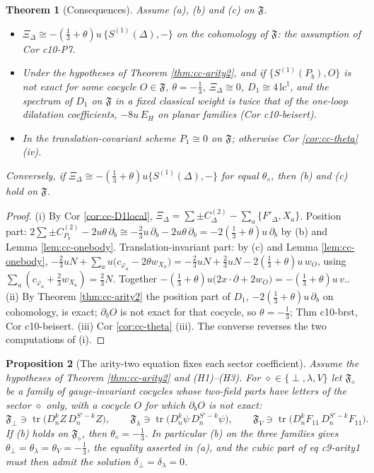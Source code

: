 \documentclass[11pt]{article}
\numberwithin{equation}{section}
\theoremstyle{plain}
\newtheorem{theorem}{Theorem}[section]
\newtheorem{proposition}[theorem]{Proposition}
\theoremstyle{definition}
\begin{document}
\begin{theorem}[Consequences]
\label{thm:cc-P7}
Assume (a), (b) and (c) on $\mathfrak F$.
\begin{itemize}
\item[(i)] $\Xi_\Delta\cong-(\tfrac13+\theta)u\,\{S^{(1)}(\Delta),-\}$ on the cohomology of $\mathfrak F$: the assumption of Cor c10-P7.
\item[(ii)] Under the hypotheses of Theorem \ref{thm:cc-arity2}, and if $\{S^{(1)}(P_b),O\}$ is not exact for some cocycle $O\in\mathfrak F$, $\theta=-\tfrac13$, $\Xi_\Delta\cong0$, $D_1\cong4\,\mathrm{lc}^\natural$, and the spectrum of $D_1$ on $\mathfrak F$ in a fixed classical weight is twice that of the one-loop dilatation coefficients, $-8u\,E_H$ on planar families (Cor c10-beisert).
\item[(iii)] In the translation-covariant scheme $P_1\cong0$ on $\mathfrak F$; otherwise Cor \ref{cor:cc-theta} (iv).
\end{itemize}
Conversely, if $\Xi_\Delta\cong-(\tfrac13+\theta)u\{S^{(1)}(\Delta),-\}$ for equal $\theta_\diamond$, then (b) and (c) hold on $\mathfrak F$.
\end{theorem}


\begin{proof}
(i) By Cor \ref{cor:cc-D1local}, $\Xi_\Delta=\sum\pm C^{(2)}_\Delta-\sum_a\{F'_\Delta,X_a\}$. Position part: $2\sum\pm C^{(2)}_{P_b}-2u\theta\,\partial_b\cong-\tfrac23u\,\partial_b-2u\theta\,\partial_b=-2(\tfrac13+\theta)u\,\partial_b$ by (b) and Lemma \ref{lem:cc-onebody}. Translation-invariant part: by (c) and Lemma \ref{lem:cc-onebody}, $-\tfrac23uN+\sum_au\big(c_{\varphi_a}-2\theta w_{X_a}\big)=-\tfrac23uN+\tfrac23uN-2(\tfrac13+\theta)u\,w_O$, using $\sum_a(c_{\varphi_a}+\tfrac23w_{X_a})=\tfrac23N$. Together $-(\tfrac13+\theta)u\big(2x\cdot\partial+2w_O\big)=-(\tfrac13+\theta)u\,v.$. (ii) By Theorem \ref{thm:cc-arity2} the position part of $D_1$, $-2(\tfrac13+\theta)u\,\partial_b$ on cohomology, is exact; $\partial_bO$ is not exact for that cocycle, so $\theta=-\tfrac13$; Thm c10-brst, Cor c10-beisert. (iii) Cor \ref{cor:cc-theta} (iii). The converse reverses the two computations of (i).
\end{proof}

\begin{proposition}[The arity-two equation fixes each sector coefficient]
\label{prop:cc-theta-sector}
Assume the hypotheses of Theorem \ref{thm:cc-arity2} and (H1)--(H3). For $\diamond\in\{\perp,\lambda,V\}$ let $\mathfrak F_\diamond$ be a family of gauge-invariant cocycles whose two-field parts have letters of the sector $\diamond$ only, with a cocycle $O$ for which $\partial_bO$ is not exact:
\[
\mathfrak F_\perp\ni\operatorname{tr}\big(D_n^kZ\,D_n^{S'-k}Z\big),\qquad \mathfrak F_\lambda\ni\operatorname{tr}\big(D_n^k\psi\,D_n^{S'-k}\psi\big),\qquad \mathfrak F_V\ni\operatorname{tr}\big(D_n^kF_{11}\,D_n^{S'-k}F_{11}\big).
\]
If (b) holds on $\mathfrak F_\diamond$, then $\theta_\diamond=-\tfrac13$. In particular (b) on the three families gives $\theta_\perp=\theta_\lambda=\theta_V=-\tfrac13$, the equality asserted in (a), and the cubic part of eq c9-arity1 must then admit the solution $\delta_\perp=\delta_\lambda=0$.
\end{proposition}
\end{document}
